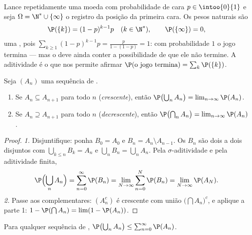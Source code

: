 \begin{example}\label{ex:b2:proba:geometric}
Lance repetidamente uma moeda com probabilidade de cara $p \in \intoo{0}{1}$
e seja $\Omega = \N^* \cup \{\infty\}$ o registro da posição da
primeira cara. Os pesos naturais são
\[
\P(\{k\}) = (1 - p)^{k-1}p
\quad (k \in \N^*),
\qquad
\P(\{\infty\}) = 0 ,
\]
uma , pois $\sum_{k\geq1}(1-p)^{k-1}p =
\frac{p}{1 - (1-p)} = 1$: com probabilidade $1$ o jogo termina ---
mas o  deve ainda conter a possibilidade de que ele
não termine. A aditividade  é o que nos permite afirmar
$\P(\text{o jogo termina}) = \sum_k \P(\{k\})$.
\end{example}

\begin{theorem}\label{thm:b2:proba:continuity}
Seja $(A_n)$ uma sequência de .
\begin{enumerate}
\item Se $A_n \subseteq A_{n+1}$ para todo $n$
(\emph{crescente}), então
$\P\bigl(\bigcup_n A_n\bigr) = \lim_{n\to\infty} \P(A_n)$.
\item Se $A_n \supseteq A_{n+1}$ para todo $n$
(\emph{decrescente}), então
$\P\bigl(\bigcap_n A_n\bigr) = \lim_{n\to\infty} \P(A_n)$.
\end{enumerate}
\end{theorem}

\begin{proof}
\emph{1.} Disjuntifique: ponha $B_0 = A_0$ e $B_n = A_n \setminus
A_{n-1}$. Os $B_n$ são dois a dois disjuntos com $\bigcup_{k \leq n}
B_k = A_n$ e $\bigcup_n B_n = \bigcup_n A_n$. Pela
$\sigma$-aditividade e pela aditividade finita,
\[
\P\Bigl(\bigcup_n A_n\Bigr)
= \sum_{n=0}^\infty \P(B_n)
= \lim_{N\to\infty}\sum_{n=0}^N \P(B_n)
= \lim_{N\to\infty}\P(A_N) .
\]
\emph{2.} Passe aos complementares: $(A_n^c)$ é crescente com união
$\bigl(\bigcap A_n\bigr)^c$, e aplique a parte 1:
$1 - \P(\bigcap A_n) = \lim (1 - \P(A_n))$.
\end{proof}

\begin{corollary}\label{cor:b2:proba:subadd}
Para qualquer sequência de , $\P\bigl(\bigcup_n A_n\bigr) \leq
\sum_{n=0}^\infty \P(A_n)$.
\end{corollary}

